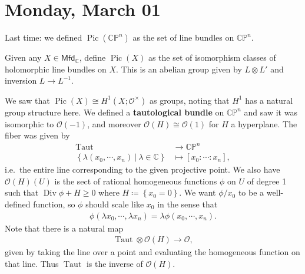 \hypertarget{monday-march-01}{%
\section{Monday, March 01}\label{monday-march-01}}

\begin{remark}

Last time: we defined \({\operatorname{Pic}}({\mathbb{CP}}^n)\) as the
set of line bundles on \({\mathbb{CP}}^n\).

\end{remark}

\begin{definition}

Given any \(X\in {\mathsf{Mfd}}_{\mathbb{C}}\), define
\({\operatorname{Pic}}(X)\) as the set of isomorphism classes of
holomorphic line bundles on \(X\). This is an abelian group given by
\(L \otimes L'\) and inversion \(L\to L^{-1}\).

\end{definition}

\begin{remark}

We saw that
\({\operatorname{Pic}}(X) \cong H^1(X; {\mathcal{O}}^{\times})\) as
groups, noting that \(H^1\) has a natural group structure here. We
defined a \textbf{tautological bundle} on \({\mathbb{CP}}^n\) and saw it
was isomorphic to \({\mathcal{O}}(-1)\), and moreover
\({\mathcal{O}}(H) \cong {\mathcal{O}}(1)\) for \(H\) a hyperplane. The
fiber was given by
\begin{align*}
\mathrm{Taut} &\to {\mathbb{CP}}^n \\
\left\{{ \lambda (x_0, \cdots, x_n) {~\mathrel{\Big|}~}\lambda\in {\mathbb{C}}}\right\} &\mapsto [x_0: \cdots : x_n]
,\end{align*}
i.e.~the entire line corresponding to the given projective point. We
also have \({\mathcal{O}}(H)(U)\) is the sect of rational homogeneous
functions \(\phi\) on \(U\) of degree 1 such that
\(\operatorname{Div}\phi + H \geq 0\) where
\(H \coloneqq\left\{{x_0 = 0}\right\}\). We want \(\phi/x_0\) to be a
well-defined function, so \(\phi\) should scale like \(x_0\) in the
sense that
\begin{align*}
\phi( \lambda x_0, \cdots, \lambda x_n) = \lambda\phi( x_0, \cdots, x_n)
.\end{align*}
Note that there is a natural map
\begin{align*}
{\operatorname{Taut}}\otimes{\mathcal{O}}(H) \xrightarrow{} {\mathcal{O}}
,\end{align*}
given by taking the line over a point and evaluating the homogeneous
function on that line. Thus \({\operatorname{Taut}}\) is the inverse of
\({\mathcal{O}}(H)\).

\end{remark}

